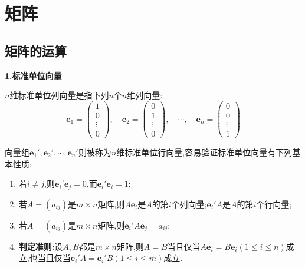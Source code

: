 \documentclass[lang=cn,newtx,10pt,scheme=chinese]{elegantbook}
\begin{document}
\chapter{矩阵}

\section{矩阵的运算}

\begin{proposition}[标准单位向量和基础矩阵]\label{proposition:标准单位向量和基础矩阵}
    \large{\textbf{1.标准单位向量}}

\(n\)维标准单位列向量是指下列\(n\)个\(n\)维列向量:
\[
\boldsymbol{e}_{1}=\left(\begin{array}{c}
1 \\
0 \\
\vdots \\
0
\end{array}\right), \quad \boldsymbol{e}_{2}=\left(\begin{array}{c}
0 \\
1 \\
\vdots \\
0
\end{array}\right), \quad \cdots, \quad \boldsymbol{e}_{n}=\left(\begin{array}{c}
0 \\
0 \\
\vdots \\
1
\end{array}\right)
\]

向量组\(\boldsymbol{e}_{1}', \boldsymbol{e}_{2}', \cdots, \boldsymbol{e}_{n}'\)则被称为\(n\)维标准单位行向量,容易验证标准单位向量有下列基本性质:
\begin{enumerate}
    \item 若\(i \neq j\),则\(\boldsymbol{e}_{i}' \boldsymbol{e}_{j}=0\),而\(\boldsymbol{e}_{i}' \boldsymbol{e}_{i}=1\);

    \item 若\(A=(a_{ij})\)是\(m\times n\)矩阵,则\(A\boldsymbol{e}_{i}\)是\(A\)的第\(i\)个列向量;\(\boldsymbol{e}_{i}'A\)是\(A\)的第\(i\)个行向量;

    \item 若\(A=(a_{ij})\)是\(m\times n\)矩阵,则\(\boldsymbol{e}_{i}'A\boldsymbol{e}_{j}=a_{ij}\);

    \item \label{矩阵相等的判定准则}\hypertarget{proposition:矩阵相等的判定法则}{\textbf{判定准则:}}设\(A,B\)都是\(m\times n\)矩阵,则\(A = B\)当且仅当\(A\boldsymbol{e}_{i}=B\boldsymbol{e}_{i}(1\leq i\leq n)\)成立,也当且仅当\(\boldsymbol{e}_{i}'A=\boldsymbol{e}_{i}'B(1\leq i\leq m)\)成立.
\end{enumerate}


\end{proposition}
\end{document}
